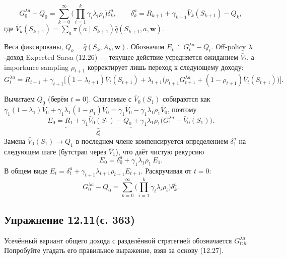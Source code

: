 \begin{equation}
    G_0^{\lambda a} - Q_0 = \sum_{k=0}^{\infty}\Big(\prod_{i=1}^{k}\gamma_i\lambda_i\rho_i\Big)\delta_k^a,
    \qquad \delta_k^a = R_{k+1} + \gamma_{k+1}\bar V_k(S_{k+1}) - Q_k,
    \tag{12.27}
\end{equation}
где $\bar V_k(S_{k+1}) = \sum_a \pi(a\mid S_{k+1})\hat q(S_{k+1},a,\mathbf w)$.

\begin{solution}
    Веса фиксированы, $Q_k=\hat q(S_k,A_k,\mathbf w)$. Обозначим $E_t \doteq
    G_t^{\lambda a} - Q_t$. Off-policy $\lambda$-доход Expected Sarsa (12.26) ---
    текущее действие усредняется ожиданием $\bar V_t$, а importance sampling
    $\rho_{t+1}$ корректирует лишь переход к следующему доходу:
    \begin{equation*}
        G_t^{\lambda a} = R_{t+1} + \gamma_{t+1}\Big[(1-\lambda_{t+1})\bar V_t(S_{t+1})
        + \lambda_{t+1}\big(\rho_{t+1}G_{t+1}^{\lambda a} + (1-\rho_{t+1})\bar V_t(S_{t+1})\big)\Big].
    \end{equation*}

    Вычитаем $Q_0$ (берём $t=0$). Слагаемые с $\bar V_0(S_1)$ собираются как
    $\gamma_1(1-\lambda_1)\bar V_0 + \gamma_1\lambda_1(1-\rho_1)\bar V_0
    = \gamma_1\bar V_0 - \gamma_1\lambda_1\rho_1\bar V_0$, поэтому
    \begin{equation*}
        E_0 = \underbrace{R_1 + \gamma_1\bar V_0(S_1) - Q_0}_{\delta_0^a}
        + \gamma_1\lambda_1\rho_1\big(G_1^{\lambda a} - \bar V_0(S_1)\big).
    \end{equation*}
    Замена $\bar V_0(S_1)\to Q_1$ в последнем члене компенсируется определением
    $\delta_1^a$ на следующем шаге (бутстрап через $\bar V_1$), что даёт чистую
    рекурсию
    \begin{equation*}
        E_0 = \delta_0^a + \gamma_1\lambda_1\rho_1\,E_1.
    \end{equation*}
    В общем виде $E_t = \delta_t^a + \gamma_{t+1}\lambda_{t+1}\rho_{t+1}E_{t+1}$.
    Раскручивая от $t=0$:
    \begin{equation*}
        G_0^{\lambda a} - Q_0 = \sum_{k=0}^{\infty}\Big(\prod_{i=1}^{k}\gamma_i\lambda_i\rho_i\Big)\delta_k^a.
    \end{equation*}
\end{solution}

\subsection{Упражнение 12.11(с. 363)}
Усечённый вариант общего дохода с разделённой стратегией обозначается
$G_{t:h}^{\lambda a}$. Попробуйте угадать его правильное выражение, взяв за основу
(12.27).

